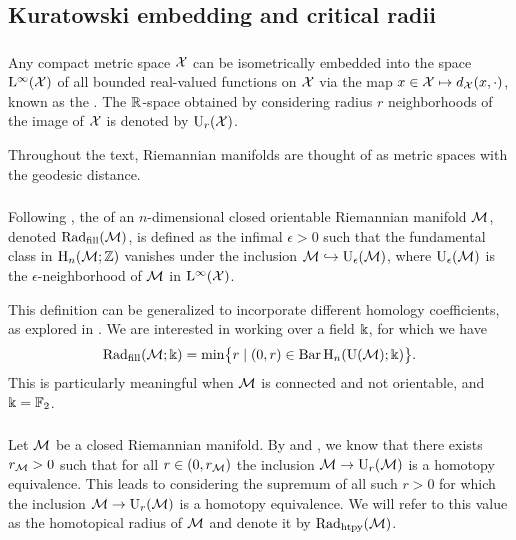 
\subsection{Kuratowski embedding and critical radii}\label{sub:filling radii}

\subsubsection{}

Any compact metric space \(\cX\) can be isometrically embedded into the space \(\rL^\infty(\cX)\) of all bounded real-valued functions on \(\cX\) via the map \(x \in \cX \mapsto d_\cX(x,\cdot)\), known as the .
The \(\R\)-space obtained by considering radius \(r\) neighborhoods of the image of \(\cX\) is denoted by \(\rU_r(\cX)\).

Throughout the text, Riemannian manifolds are thought of as metric spaces with the geodesic distance.

\subsubsection{}

Following \cite{gromov1983filling}, the  of an \(n\)-dimensional closed orientable Riemannian manifold \(\cM\), denoted \(\fillrad(\cM)\), is defined as the infimal \(\epsilon > 0\) such that the fundamental class in \(\rH_n(\cM; \Z)\) vanishes under the inclusion \(\cM \hookrightarrow \rU_\epsilon(\cM)\), where \(\rU_\epsilon(\cM)\) is the \(\epsilon\)-neighborhood of \(\cM\) in \(\rL^\infty(\cX)\).

This definition can be generalized to incorporate different homology coefficients, as explored in \cite{lim2024vietoris}.
We are interested in working over a field \(\k\), for which we have
\[
\fillrad(\cM; \field) = \min\set[\big]{r \mid (0, r) \in \barc \rH_n(\rU(\cM); \field)}.
\]
This is particularly meaningful when \(\cM\) is connected and not orientable, and \(\k = \Ftwo\).

\subsubsection{}\label{ss:first_critical_value}

Let \(\cM\) be a closed Riemannian manifold.
By \cite[Thm.~3.5]{hausmann1995vietoris} and \cite[Thm.~4.1]{lim2024vietoris}, we know that there exists \(r_\cM > 0\) such that for all \(r \in (0, r_\cM)\) the inclusion \(\cM \to \rU_{r}(\cM)\) is a homotopy equivalence.
This leads to considering the supremum of all such \(r > 0\) for which the inclusion \(\cM \to \rU_r(\cM)\) is a homotopy
equivalence.
We will refer to this value as the homotopical radius of $\cM$ and denote it by \(\crit(\mathcal{M})\).


